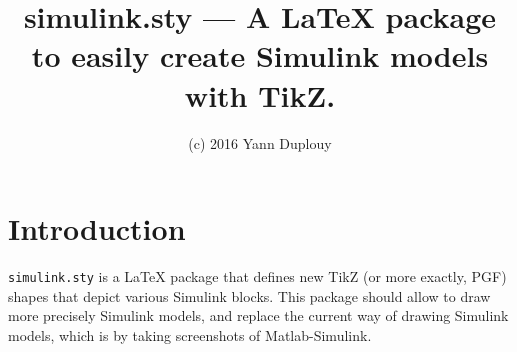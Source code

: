 \documentclass[a4paper]{article}
\title{simulink.sty --- A \LaTeX{} package to easily create Simulink models
       with TikZ.\\ {\large \skstyversion}}
\author{(c) 2016 Yann Duplouy}
\begin{document}
    \maketitle
    \vspace{-0.5cm}

    \tableofcontents
    \clearpage

\section{Introduction}
    {\tt simulink.sty} is a \LaTeX{} package that defines new TikZ (or more
exactly, PGF) shapes that depict various Simulink blocks. This package should
allow to draw more precisely Simulink models, and replace the current way of
drawing Simulink models, which is by taking screenshots of Matlab-Simulink.
\end{document}
